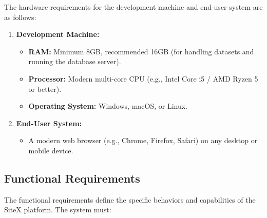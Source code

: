 The hardware requirements for the development machine and end-user system are as follows:
\begin{enumerate}[label=\alph*.]
	\item \textbf{Development Machine:}
	      \begin{itemize}
		      \item \textbf{RAM:} Minimum 8GB, recommended 16GB (for handling datasets and running the database server).
		      \item \textbf{Processor:} Modern multi-core CPU (e.g., Intel Core i5 / AMD Ryzen 5 or better).
		      \item \textbf{Operating System:} Windows, macOS, or Linux.
	      \end{itemize}
	\item \textbf{End-User System:}
	      \begin{itemize}
		      \item A modern web browser (e.g., Chrome, Firefox, Safari) on any desktop or mobile device.
	      \end{itemize}
\end{enumerate}

\subsection{Functional Requirements}
The functional requirements define the specific behaviors and capabilities of the SiteX platform. The system must:

